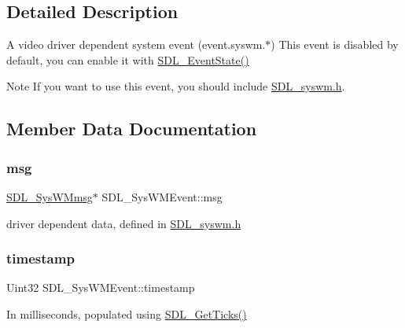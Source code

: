 \subsection{Detailed Description}
A video driver dependent system event (event.\+syswm.$\ast$) This event is disabled by default, you can enable it with \hyperlink{SDL__events_8h_afb772893e1c46f186fa39a4defe76df3}{S\+D\+L\+\_\+\+Event\+State()} 

\begin{DoxyNote}{Note}
If you want to use this event, you should include \hyperlink{SDL__syswm_8h}{S\+D\+L\+\_\+syswm.\+h}. 
\end{DoxyNote}


\subsection{Member Data Documentation}
\mbox{\label{structSDL__SysWMEvent_ad5e3dc68aa15582cd0641847d41c74e8}} 
\subsubsection{\texorpdfstring{msg}{msg}}
{\footnotesize\ttfamily \hyperlink{structSDL__SysWMmsg}{S\+D\+L\+\_\+\+Sys\+W\+Mmsg}$\ast$ S\+D\+L\+\_\+\+Sys\+W\+M\+Event\+::msg}

driver dependent data, defined in \hyperlink{SDL__syswm_8h}{S\+D\+L\+\_\+syswm.\+h} \mbox{\label{structSDL__SysWMEvent_a5d3cb97006d99b620c2671c27bd82c06}} 
\subsubsection{\texorpdfstring{timestamp}{timestamp}}
{\footnotesize\ttfamily Uint32 S\+D\+L\+\_\+\+Sys\+W\+M\+Event\+::timestamp}

In milliseconds, populated using \hyperlink{SDL__timer_8h_a0b9bc71d6287e0ffafdc3419760fe2b3}{S\+D\+L\+\_\+\+Get\+Ticks()} \mbox{\label{structSDL__SysWMEvent_a84697e96cb16bf6a570e10b5bfdcd392}} 
